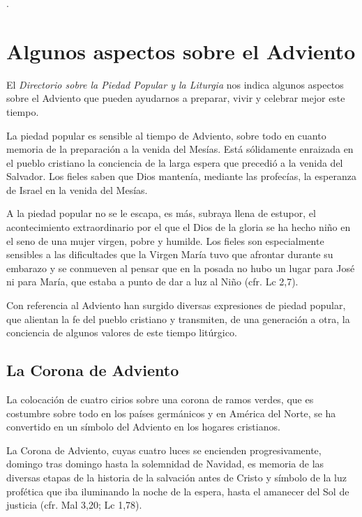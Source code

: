 \begin{introstyle}
	.
	
	\section{Algunos aspectos sobre el Adviento}
	
	El \emph{Directorio sobre la Piedad Popular y la Liturgia} nos indica algunos aspectos sobre el Adviento que pueden ayudarnos a preparar, vivir y celebrar mejor este tiempo\label{fn8}.
	
	La piedad popular es sensible al tiempo de Adviento, sobre todo en cuanto memoria de la preparación a la venida del Mesías. Está sólidamente enraizada en el pueblo cristiano la conciencia de la larga espera que precedió a la venida del Salvador. Los fieles saben que Dios
	mantenía, mediante las profecías, la esperanza de Israel en la venida del Mesías.
	
	A la piedad popular no se le escapa, es más, subraya llena de estupor, el acontecimiento extraordinario por el que el Dios de la gloria se ha hecho niño en el seno de una mujer virgen, pobre y humilde. Los fieles	son especialmente sensibles a las dificultades que la Virgen María tuvo que afrontar durante su embarazo y se conmueven al pensar que en la
	posada no hubo un lugar para José ni para María, que estaba a punto de dar a luz al Niño (cfr. Lc 2,7).
	
	Con referencia al Adviento han surgido diversas expresiones de piedad popular, que alientan la fe del pueblo cristiano y transmiten, de una generación a otra, la conciencia de algunos valores de este tiempo litúrgico.
	
	
	\subsection{La Corona de Adviento}
	
	La colocación de cuatro cirios sobre una corona de ramos verdes, que es costumbre sobre todo en los países germánicos y en América del Norte, se ha convertido en un símbolo del Adviento en los hogares cristianos.
	
	La Corona de Adviento, cuyas cuatro luces se encienden progresivamente,	domingo tras domingo hasta la solemnidad de Navidad, es memoria de las diversas etapas de la historia de la salvación antes de Cristo y símbolo	de la luz profética que iba iluminando la noche de la espera, hasta el amanecer del Sol de justicia (cfr. Mal 3,20; Lc 1,78).
	

\end{introstyle}
